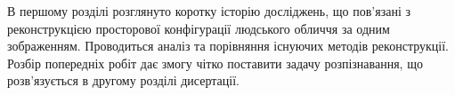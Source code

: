 В першому розділі розглянуто коротку історію досліджень,
що пов'язані з реконструкцією просторової конфігурації
людського обличчя за одним зображенням.
Проводиться аналіз та порівняння існуючих методів реконструкції.
Розбір попередніх робіт дає змогу чітко поставити задачу розпізнавання,
що розв'язується в другому розділі дисертації.
